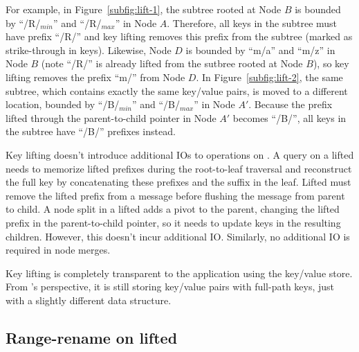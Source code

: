 For example, in Figure~\ref{subfig:lift-1}, the subtree rooted at Node $B$ is
bounded by ``/R/$_{min}$'' and ``/R/$_{max}$'' in Node $A$.
Therefore, all keys in the subtree must have prefix ``/R/'' and key lifting
removes this prefix from the subtree (marked as strike-through in keys).
Likewise, Node $D$ is bounded by ``m/a'' and ``m/z'' in Node $B$
(note ``/R/'' is already lifted from the sutbree rooted at Node $B$),
so key lifting removes the prefix ``m/'' from Node $D$.
In Figure~\ref{subfig:lift-2}, the same subtree, which contains exactly the
same key/value pairs, is moved to a different location, bounded by
``/B/$_{min}$'' and ``/B/$_{max}$'' in Node $A'$.
Because the prefix lifted through the parent-to-child pointer in Node $A'$
becomes ``/B/'', all keys in the subtree have ``/B/'' prefixes instead.

Key lifting doesn't introduce additional IOs to operations on \bets.
A query on a lifted \bet needs to memorize lifted prefixes during the
root-to-leaf traversal and reconstruct the full key by concatenating these
prefixes and the suffix in the leaf.
Lifted \bets must remove the lifted prefix from a message before flushing the
message from parent to child.
A node split in a lifted \bet adds a pivot to the parent, changing the lifted
prefix in the parent-to-child pointer, so it needs to update keys in the
resulting children.
However, this doesn't incur additional IO.
Similarly, no additional IO is required in node merges.

Key lifting is completely transparent to the application using the key/value
store.
From \betrfs's perspective, it is still storing key/value pairs with
full-path keys, just with a slightly different data structure.

\subsection{Range-rename on lifted \bets}

